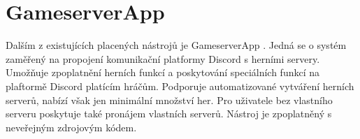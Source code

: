 \section{GameserverApp}

Dalším z existujících placených nástrojů je GameserverApp \cite{gameserverapp}. Jedná se o systém zaměřený na propojení komunikační platformy Discord s herními servery.
Umožňuje zpoplatnění herních funkcí a poskytování speciálních funkcí na plaftormě Discord platícím hráčům. Podporuje automatizované vytváření herních serverů, nabízí však jen
minimální množství her. Pro uživatele bez vlastního serveru poskytuje také pronájem vlastních serverů. Nástroj je zpoplatněný s neveřejným zdrojovým kódem.
